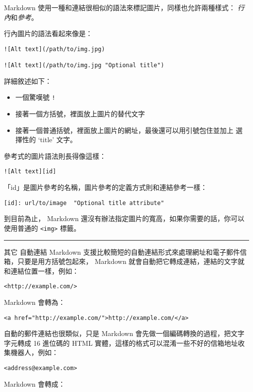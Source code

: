 Markdown 使用一種和連結很相似的語法來標記圖片，同樣也允許兩種樣式：
\emph{行內}和\emph{參考}。

行內圖片的語法看起來像是：

\begin{verbatim}
![Alt text](/path/to/img.jpg)

![Alt text](/path/to/img.jpg "Optional title")
\end{verbatim}
詳細敘述如下：

\begin{itemize}
\item
  一個驚嘆號 \texttt{!}
\item
  接著一個方括號，裡面放上圖片的替代文字
\item
  接著一個普通括號，裡面放上圖片的網址，最後還可以用引號包住並加上
  選擇性的 `title' 文字。
\end{itemize}
參考式的圖片語法則長得像這樣：

\begin{verbatim}
![Alt text][id]
\end{verbatim}
「id」是圖片參考的名稱，圖片參考的定義方式則和連結參考一樣：

\begin{verbatim}
[id]: url/to/image  "Optional title attribute"
\end{verbatim}
到目前為止， Markdown
還沒有辦法指定圖片的寬高，如果你需要的話，你可以使用普通的
\texttt{\textless{}img\textgreater{}} 標籤。

\begin{center}\rule{3in}{0.4pt}\end{center}

其它
自動連結
Markdown
支援比較簡短的自動連結形式來處理網址和電子郵件信箱，只要是用方括號包起來，
Markdown 就會自動把它轉成連結，連結的文字就和連結位置一樣，例如：

\begin{verbatim}
<http://example.com/>
\end{verbatim}
Markdown 會轉為：

\begin{verbatim}
<a href="http://example.com/">http://example.com/</a>
\end{verbatim}
自動的郵件連結也很類似，只是 Markdown
會先做一個編碼轉換的過程，把文字字元轉成 16 進位碼的 HTML
實體，這樣的格式可以混淆一些不好的信箱地址收集機器人，例如：

\begin{verbatim}
<address@example.com>
\end{verbatim}
Markdown 會轉成：

